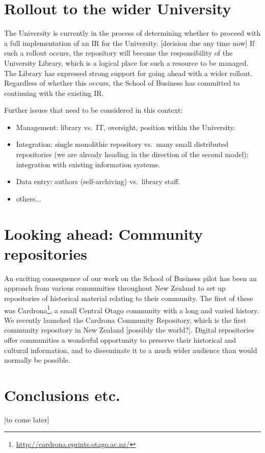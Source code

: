 \documentclass[12pt,pdftex,a4paper,titlepage]{article}
\begin{document}
\section{Rollout to the wider University}

The University is currently in the process of determining whether to proceed with a full implementation of an IR for the University. [decision due any time now] If such a rollout occurs, the repository will become the responsibility of the University Library, which is a logical place for such a resource to be managed. The Library has expressed strong support for going ahead with a wider rollout. Regardless of whether this occurs, the School of Business has committed to continuing with the existing IR.

Further issues that need to be considered in this context:


\begin{itemize}

	\item Management: library vs.\ IT, oversight, position within the University.

	\item Integration: single monolithic repository vs.\ many small distributed repositories (we are already heading in the direction of the second model); integration with existing information systems.

	\item Data entry: authors (self-archiving) vs.\ library staff.

	\item others...

\end{itemize}


\section{Looking ahead: Community repositories}

An exciting consequence of our work on the School of Business pilot has been an approach from various communities throughout New Zealand to set up repositories of historical material relating to their community. The first of these was Cardrona\footnote{\url{http://cardrona.eprints.otago.ac.nz/}}, a small Central Otago community with a long and varied history. We recently launched the Cardrona Community Repository, which is the first community repository in New Zealand [possibly the world?]. Digital repositories offer communities a wonderful opportunity to preserve their historical and cultural information, and to disseminate it to a much wider audience than would normally be possible.


\section{Conclusions etc.}

[to come later]



\end{document}
